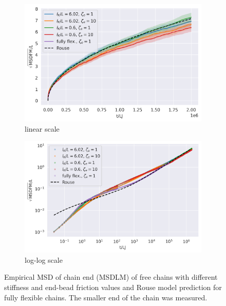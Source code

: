 \documentclass[
    paper=A4,pagesize=automedia,fontsize=12pt,
    BCOR=15mm,DIV=22,
    twoside,headinclude,footinclude=false,
    fleqn,             %
    bibliography=totocnumbered,          %
    listof=totoc,                %
    listof=flat,                 %
    cleardoublepage=empty      %
    numbers=endperiod
]{scrartcl}
\begin{document}
\begin{figure}
    \centering
    \begin{subfigure}[b]{\textwidth}
        \centering
        \includegraphics[width=\textwidth]{17+18+19+20-exp-msd-fm.png}
        \caption{linear scale}
        \label{fig:msd_fm_free-normal}
    \end{subfigure}
    \begin{subfigure}[b]{\textwidth}
        \centering
        \includegraphics[width=\textwidth]{17+18+19+20-exp-msd-fm-log.png}
        \caption{log-log scale}
        \label{fig:msd_fm_free-log}
    \end{subfigure}
    \caption{
        Empirical MSD of chain end (MSDLM) of free chains
        with different stiffness and end-bead friction values and
        Rouse model prediction for fully flexible chains.
        The smaller end of the chain was measured.
    }
    \label{fig:msd_fm_free}
\end{figure}
\end{document}
